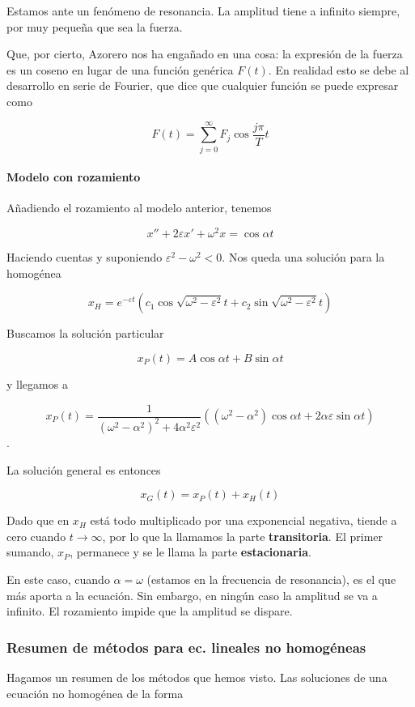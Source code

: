 \documentclass{mathnotes}
\begin{document}
Estamos ante un fenómeno de resonancia. La amplitud tiene a infinito siempre, por muy pequeña que sea la fuerza.

Que, por cierto, Azorero nos ha engañado en una cosa: la expresión de la fuerza es un coseno en lugar de una función genérica $F(t)$. En realidad esto se debe al desarrollo en serie de Fourier, que dice que cualquier función se puede expresar como 

\[ F(t) = \sum_{j=0}^∞ F_j \cos \frac{jπ}{T}t \]

\paragraph{Modelo con rozamiento}

Añadiendo el rozamiento al modelo anterior, tenemos

\[ x''+2εx'+ω^2x = \cos αt \]

Haciendo cuentas y suponiendo $ε^2-ω^2<0$. Nos queda una solución para la homogénea

\[ x_H = e^{-εt}\left(c_1 \cos \sqrt{ω^2-ε^2}t + c_2 \sin \sqrt{ω^2-ε^2}t\right) \]

Buscamos la solución particular

\[ x_P (t) = A\cos αt + B\sin αt \]

y llegamos a 

\[ x_P(t) = \frac{1}{(ω^2-α^2)^2 + 4α^2ε^2}\left((ω^2-α^2)\cos αt + 2αε \sin αt \right) \].

La solución general es entonces

\[ x_G(t) = x_P(t) + x_H(t) \]

Dado que en $x_H$ está todo multiplicado por una exponencial negativa, tiende a cero cuando $t\to ∞$, por lo que la llamamos la parte \textbf{transitoria}. El primer sumando, $x_P$, permanece y se le llama la parte \textbf{estacionaria}.

En este caso, cuando $α=ω$ (estamos en la frecuencia de resonancia), es el que más aporta a la ecuación. Sin embargo, en ningún caso la amplitud se va a infinito. El rozamiento impide que la amplitud se dispare.

\subsubsection{Resumen de métodos para ec. lineales no homogéneas}

Hagamos un resumen de los métodos que hemos visto. Las soluciones de una ecuación no homogénea de la forma
\end{document}
